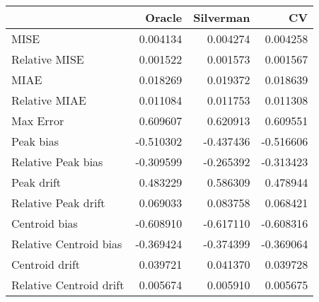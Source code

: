 \begin{tabular}{lrrr}
  \hline
 & Oracle & Silverman & CV \\ 
  \hline
MISE & 0.004134 & 0.004274 & 0.004258 \\ 
  Relative MISE & 0.001522 & 0.001573 & 0.001567 \\ 
  MIAE & 0.018269 & 0.019372 & 0.018639 \\ 
  Relative MIAE & 0.011084 & 0.011753 & 0.011308 \\ 
  Max Error & 0.609607 & 0.620913 & 0.609551 \\ 
  Peak bias & -0.510302 & -0.437436 & -0.516606 \\ 
  Relative Peak bias & -0.309599 & -0.265392 & -0.313423 \\ 
  Peak drift & 0.483229 & 0.586309 & 0.478944 \\ 
  Relative Peak drift & 0.069033 & 0.083758 & 0.068421 \\ 
  Centroid bias & -0.608910 & -0.617110 & -0.608316 \\ 
  Relative Centroid bias & -0.369424 & -0.374399 & -0.369064 \\ 
  Centroid drift & 0.039721 & 0.041370 & 0.039728 \\ 
  Relative Centroid drift & 0.005674 & 0.005910 & 0.005675 \\ 
   \hline
\end{tabular}
